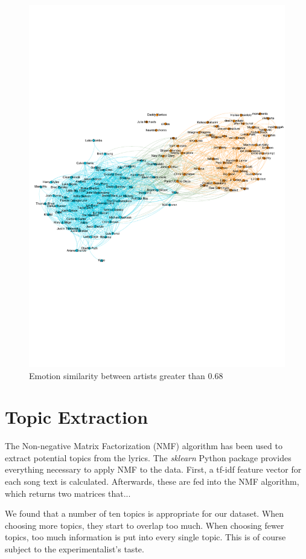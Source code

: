 \documentclass[10pt,a4paper]{article}
\begin{document}
		\begin{figure}[htb]
			\centering
			\includegraphics[trim=0mm 5mm 0mm 5mm, clip, width=0.8\linewidth]{data/emotion_similarity}
			\caption{Emotion similarity between artists greater than $0.68$}
			\label{fig:emotionsimilarity}
		\end{figure}
	
	\section{Topic Extraction}
	\label{sec:topicextraction}
	The Non-negative Matrix Factorization (NMF) algorithm has been used to extract potential topics from the lyrics. The \textit{sklearn} Python package provides everything necessary to apply NMF to the data. First, a tf-idf feature vector for each song text is calculated. Afterwards, these are fed into the NMF algorithm, which returns two matrices that...
	
	We found that a number of ten topics is appropriate for our dataset. When choosing more topics, they start to overlap too much. When choosing fewer topics, too much information is put into every single topic. This is of course subject to the experimentalist's taste.
	
\end{document}
